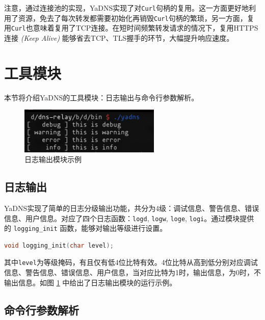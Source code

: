 注意，通过连接池的实现，YaDNS实现了对\lstinline{Curl}句柄的复用。这一方面更好地利用了资源，免去了每次转发都需要初始化再销毁\lstinline{Curl}句柄的繁琐，另一方面，复用\lstinline{Curl}也意味着复用了TCP连接。在短时间频繁转发请求的情况下，复用HTTPS连接 \emph{(Keep Alive)} 能够省去TCP、TLS握手的环节，大幅提升响应速度。

\section{工具模块}

本节将介绍YaDNS的工具模块：日志输出与命令行参数解析。

\begin{figure}[h]
  \centering
  \includegraphics[width=0.6\textwidth]{figures/logging}
  \caption{日志输出模块示例}
  \label{fig:logging}
\end{figure}

\subsection{日志输出}

YaDNS实现了简单的日志分级输出功能，共分为4级：调试信息、警告信息、错误信息、用户信息。对应了四个日志函数：\lstinline{logd}, \lstinline{logw}, \lstinline{loge}, \lstinline{logi}。通过模块提供的 \lstinline{logging_init} 函数，能够对输出等级进行设置。
\begin{lstlisting}[language=C]
void logging_init(char level);
\end{lstlisting}
其中\lstinline{level}为等级掩码，有且仅有低4位比特有效。4位比特从高到低分别对应调试信息、警告信息、错误信息、用户信息，当对应比特为1时，输出信息，为0时，不输出信息。如图 \ref{fig:logging} 中给出了日志输出模块的运行示例。

\subsection{命令行参数解析}

